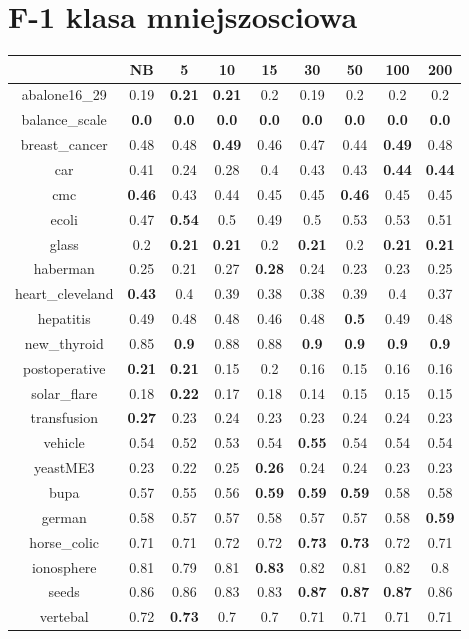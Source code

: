 \documentclass{article}%
\begin{document}
%
\section*{F{-}1 klasa mniejszosciowa}%
\begin{tabular}{c|cccccccc}%
\hline%
&NB&5&10&15&30&50&100&200\\%
\hline%
abalone16\_29&0.19&\textbf{0.21}&\textbf{0.21}&0.2&0.19&0.2&0.2&0.2\\%
\hline%
balance\_scale&\textbf{0.0}&\textbf{0.0}&\textbf{0.0}&\textbf{0.0}&\textbf{0.0}&\textbf{0.0}&\textbf{0.0}&\textbf{0.0}\\%
\hline%
breast\_cancer&0.48&0.48&\textbf{0.49}&0.46&0.47&0.44&\textbf{0.49}&0.48\\%
\hline%
car&0.41&0.24&0.28&0.4&0.43&0.43&\textbf{0.44}&\textbf{0.44}\\%
\hline%
cmc&\textbf{0.46}&0.43&0.44&0.45&0.45&\textbf{0.46}&0.45&0.45\\%
\hline%
ecoli&0.47&\textbf{0.54}&0.5&0.49&0.5&0.53&0.53&0.51\\%
\hline%
glass&0.2&\textbf{0.21}&\textbf{0.21}&0.2&\textbf{0.21}&0.2&\textbf{0.21}&\textbf{0.21}\\%
\hline%
haberman&0.25&0.21&0.27&\textbf{0.28}&0.24&0.23&0.23&0.25\\%
\hline%
heart\_cleveland&\textbf{0.43}&0.4&0.39&0.38&0.38&0.39&0.4&0.37\\%
\hline%
hepatitis&0.49&0.48&0.48&0.46&0.48&\textbf{0.5}&0.49&0.48\\%
\hline%
new\_thyroid&0.85&\textbf{0.9}&0.88&0.88&\textbf{0.9}&\textbf{0.9}&\textbf{0.9}&\textbf{0.9}\\%
\hline%
postoperative&\textbf{0.21}&\textbf{0.21}&0.15&0.2&0.16&0.15&0.16&0.16\\%
\hline%
solar\_flare&0.18&\textbf{0.22}&0.17&0.18&0.14&0.15&0.15&0.15\\%
\hline%
transfusion&\textbf{0.27}&0.23&0.24&0.23&0.23&0.24&0.24&0.23\\%
\hline%
vehicle&0.54&0.52&0.53&0.54&\textbf{0.55}&0.54&0.54&0.54\\%
\hline%
yeastME3&0.23&0.22&0.25&\textbf{0.26}&0.24&0.24&0.23&0.23\\%
\hline%
bupa&0.57&0.55&0.56&\textbf{0.59}&\textbf{0.59}&\textbf{0.59}&0.58&0.58\\%
\hline%
german&0.58&0.57&0.57&0.58&0.57&0.57&0.58&\textbf{0.59}\\%
\hline%
horse\_colic&0.71&0.71&0.72&0.72&\textbf{0.73}&\textbf{0.73}&0.72&0.71\\%
\hline%
ionosphere&0.81&0.79&0.81&\textbf{0.83}&0.82&0.81&0.82&0.8\\%
\hline%
seeds&0.86&0.86&0.83&0.83&\textbf{0.87}&\textbf{0.87}&\textbf{0.87}&0.86\\%
\hline%
vertebal&0.72&\textbf{0.73}&0.7&0.7&0.71&0.71&0.71&0.71\\%
\hline%
\end{tabular}
\end{document}
